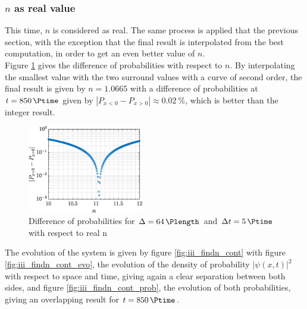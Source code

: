 \documentclass[a4paper,12pt,twoside]{article}
\newcommand{\abs}[1]{\left|#1\right|}
\begin{document}
    \subsubsection{$n$ as real value}
      This time, $n$ is considered as real.
      The same process is applied that the previous section, with the exception that the final result is interpolated from the best computation, in order to get an even better value of $n$.\\

      Figure \ref{fig:iii_findn_cont_n} gives the difference of probabilities with respect to $n$.
      By interpolating the smallest value with the two surround values with a curve of second order, the final result is given by $n=\num{1.0665}$ with a difference of probabilities at $t=\SI{850}{\Ptime}$ given by $\abs{P_{x<0} - P_{x>0}} \approx \SI{0.02}{\percent}$, which is better than the integer result.\\

      \begin{figure}[h]
        \centering
        \includegraphics[width=0.45\textwidth]{graphs/iii_findn_cont_n.eps}
        \caption{Difference of probabilities for $\Delta = \SI{64}{\Plength}$ and $\Delta t = \SI{5}{\Ptime}$ with respect to real n}
        \label{fig:iii_findn_cont_n}
      \end{figure}

      The evolution of the system is given by figure \ref{fig:iii_findn_cont} with figure \ref{fig:iii_findn_cont_evo}, the evolution of the density of probability $\abs{\psi(x,t)}^2$ with respect to space and time, giving again a clear separation between both sides, and figure \ref{fig:iii_findn_cont_prob}, the evolution of both probabilities, giving an overlapping result for $t=\SI{850}{\Ptime}$.\\
\end{document}
